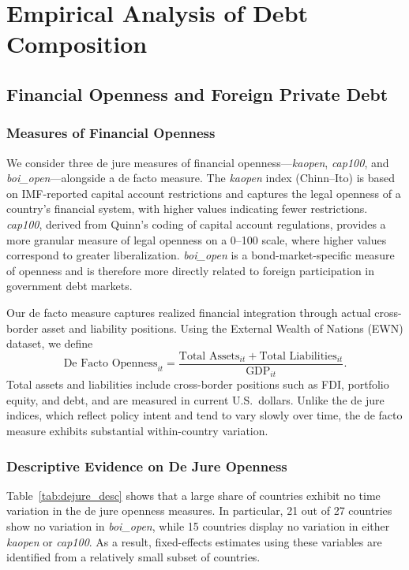 \documentclass[\latexroot/\projectname]{subfiles}
\begin{document}
\section{Empirical Analysis of Debt Composition}
\whenintegrated{\label{sec:empirical}}

\subsection{Financial Openness and Foreign Private Debt}

\subsubsection{Measures of Financial Openness}

We consider three de jure measures of financial openness---\textit{kaopen}, \textit{cap100}, and \textit{boi\_open}---alongside a de facto measure. The \textit{kaopen} index (Chinn--Ito) is based on IMF-reported capital account restrictions and captures the legal openness of a country's financial system, with higher values indicating fewer restrictions. \textit{cap100}, derived from Quinn's coding of capital account regulations, provides a more granular measure of legal openness on a 0--100 scale, where higher values correspond to greater liberalization. \textit{boi\_open} is a bond-market-specific measure of openness and is therefore more directly related to foreign participation in government debt markets.

Our de facto measure captures realized financial integration through actual cross-border asset and liability positions. Using the External Wealth of Nations (EWN) dataset, we define
\[
\text{De Facto Openness}_{it}
=
\frac{\text{Total Assets}_{it}+\text{Total Liabilities}_{it}}{\text{GDP}_{it}}.
\]
Total assets and liabilities include cross-border positions such as FDI, portfolio equity, and debt, and are measured in current U.S.\ dollars. Unlike the de jure indices, which reflect policy intent and tend to vary slowly over time, the de facto measure exhibits substantial within-country variation.

\subsubsection{Descriptive Evidence on De Jure Openness}

Table~\ref{tab:dejure_desc} shows that a large share of countries exhibit no time variation in the de jure openness measures. In particular, 21 out of 27 countries show no variation in \textit{boi\_open}, while 15 countries display no variation in either \textit{kaopen} or \textit{cap100}. As a result, fixed-effects estimates using these variables are identified from a relatively small subset of countries.
\end{document}

